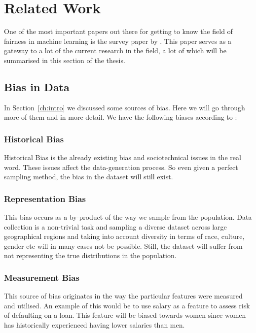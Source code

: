 \chapter{Related Work}
\label{ch:related}

One of the most important papers out there for getting to know the field of fairness in machine learning is the survey paper by \citet{Mehrabi:2021:CSUR}. This paper serves as a gateway to a lot of the current research in the field, a lot of which will be summarised in this section of the thesis.

\section{Bias in Data}

In Section~\ref{ch:intro} we discussed some sources of bias. Here we will go through more of them and in more detail. We have the following biases according to \citet{Mehrabi:2021:CSUR}:

\subsection{Historical Bias}

Historical Bias is the already existing bias and sociotechnical issues in the real word. These issues affect the data-generation process. So even given a perfect sampling method, the bias in the dataset will still exist. \cite{Suresh:2019:arXiv}

\subsection{Representation Bias}

This bias occurs as a by-product of the way we sample from the population. \cite{Suresh:2019:arXiv} Data collection is a non-trivial task and sampling a diverse dataset across large geographical regions and taking into account diversity in terms of race, culture, gender etc will in many cases not be possible. Still, the dataset will suffer from not representing the true distributions in the population.

\subsection{Measurement Bias}

This source of bias originates in the way the particular features were measured and utilised. \cite{Suresh:2019:arXiv} An example of this would be to use salary as a feature to assess risk of defaulting on a loan. This feature will be biased towards women since women has historically experienced having lower salaries than men.

